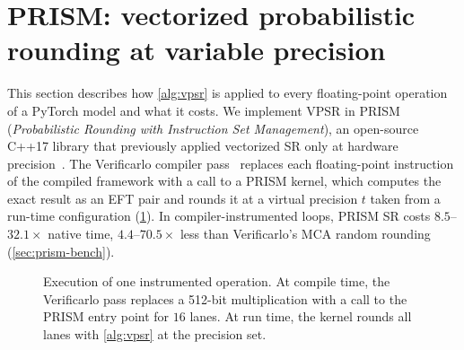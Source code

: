 \section{PRISM: vectorized probabilistic rounding at variable precision}
\label{sec:prism}

This section describes how \cref{alg:vpsr} is applied to every floating-point
operation of a PyTorch model and what it costs. We implement VPSR in PRISM
(\emph{Probabilistic Rounding with Instruction Set Management}), an open-source
C++17 library that previously applied vectorized SR only at hardware
precision~\citep{gonzalezpepe2026fuzzy}. The Verificarlo compiler
pass~\citep{denis2016verificarlo} replaces each floating-point instruction of
the compiled framework with a call to a PRISM kernel, which computes the exact
result as an EFT pair and rounds it at a virtual precision $t$ taken from a
run-time configuration (\cref{fig:prism-pipeline}). In compiler-instrumented
loops, PRISM SR costs $8.5$--$32.1\times$ native time, $4.4$--$70.5\times$ less
than Verificarlo's MCA random rounding (\cref{sec:prism-bench}).

\begin{figure}[htb]
  \centering
  \caption{Execution of one instrumented operation. At compile time, the
    Verificarlo pass replaces a 512-bit  multiplication with a
    call to the PRISM entry point for $16$ lanes. At run time, the kernel
    rounds all lanes with \cref{alg:vpsr} at the precision set.}
  \label{fig:prism-pipeline}
\end{figure}

